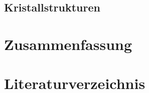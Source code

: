 \documentclass[12pt, a4paper]{article}
\begin{document}
\subsection{Kristallstrukturen}




\newpage
\section{Zusammenfassung}




\newpage
\section{Literaturverzeichnis}
\printbibliography
\end{document}
